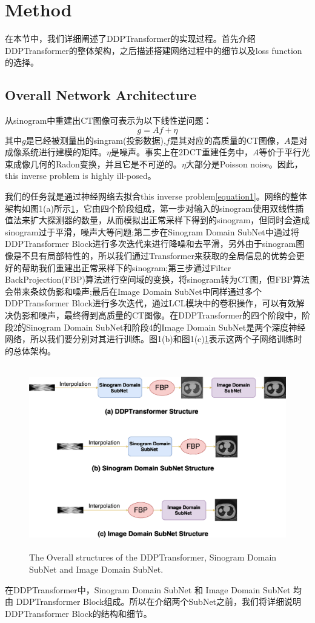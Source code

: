 \section{Method}
在本节中，我们详细阐述了DDPTransformer的实现过程。首先介绍DDPTransformer的整体架构，之后描述搭建网络过程中的细节以及loss function的选择。
\subsection{Overall Network Architecture}
从sinogram中重建出CT图像可表示为以下线性逆问题：
\begin{equation}
	\label{equation1}
	g = Af+\eta
\end{equation}
其中$g$是已经被测量出的singram(投影数据),$f$是其对应的高质量的CT图像，$A$是对成像系统进行建模的矩阵。$\eta$是噪声。事实上在2DCT重建任务中，$A$等价于平行光束成像几何的Radon变换，并且它是不可逆的。$\eta$大部分是Poisson noise。因此，this inverse problem is highly ill-posed。\par
我们的任务就是通过神经网络去拟合this inverse problem\ref{equation1}。网络的整体架构如图1(a)所示\ref{fig1}，它由四个阶段组成，第一步对输入的sinogram使用双线性插值法来扩大探测器的数量，从而模拟出正常采样下得到的sinogram，但同时会造成sinogram过于平滑，噪声大等问题;第二步在Sinogram Domain SubNet中通过将DDPTransformer Block进行多次迭代来进行降噪和去平滑，另外由于sinogram图像是不具有局部特性的，所以我们通过Transformer来获取的全局信息的优势会更好的帮助我们重建出正常采样下的sinogram;第三步通过Filter BackProjection(FBP)算法进行空间域的变换，将sinogram转为CT图，但FBP算法会带来条纹伪影和噪声;最后在Image Domain SubNet中同样通过多个DDPTransformer Block进行多次迭代，通过LCL模块中的卷积操作，可以有效解决伪影和噪声，最终得到高质量的CT图像。在DDPTransformer的四个阶段中，阶段2的Sinogram Domain SubNet和阶段4的Image Domain SubNet是两个深度神经网络，所以我们要分别对其进行训练。图1(b)和图1(c)\ref{fig1}表示这两个子网络训练时的总体架构。\par
\begin{figure}
	\centering
	\includegraphics[height=8cm,width=12cm]{1.eps}
	\caption{The Overall structures of the DDPTransformer, Sinogram Domain SubNet
	 and Image Domain SubNet.}
	\label{fig1}
\end{figure}
在DDPTransformer中，Sinogram Domain SubNet 和 Image Domain SubNet 均由 DDPTransformer Block组成。所以在介绍两个SubNet之前，我们将详细说明DDPTransformer Block的结构和细节。
